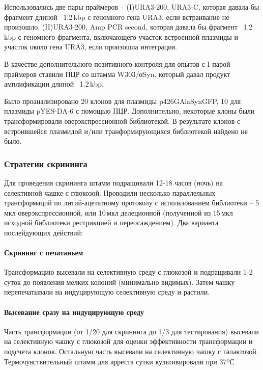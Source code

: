 Использовались две пары праймеров -- (I)URA3-200, URA3-C, которая давала бы фрагмент длиной ~1.2\,kbp с геномного гена URA3, если встраивание не произошло, (II)URA3-200, Amp PCR second, которая давала бы фрагмент ~1.2\,kbp с геномного фрагмента, включающего участок встроенной плазмиды и участок около гена URA3, если произошла интеграция.

В качестве дополнительного позитивного контроля для опытов с I парой праймеров ставили ПЦР со штамма W303/αSyn, который давал продукт амплификации длиной  ~1.2\,kbp. 

Было проанализировано 20 клонов для плазмиды p426GAlaSynGFP, 10 для плазмиды pYES-DA-6 с помощью ПЦР. Дополнительно, некоторые клоны были трансформировали оверэкспрессионной библиотекой. В результате клонов с встроившейся плазмидой и/или транформирующихся библиотекой найдено не было.



\subsubsection{Стратегии скрининга}
\label{subsec:screening_strats}

Для проведения скрининга штамм подращивали 12-18 часов (ночь) на селективной чашке с глюкозой. Проводили несколько параллельных трансформаций по литий-ацетатному протоколу с использованием библиотеки -- 5\,мкл оверэкспрессионной, или 10\,мкл делеционной (полученной из 15\,мкл исходной библиотеки рестрикцией и переосаждением). Два варианта послейдующих действий:

\paragraph{Скрининг с печатаньем}
\label{subsec:printing}
Трансформацию высевали на  селективную среду с глюкозой и подращивали 1-2 суток до появления мелких колоний (минимально видимых). Затем чашку перепечатывали на индуцирующую селективную среду и растили. 
  

\paragraph{Высевание сразу на индуцирующую среду}
\label{subsec:immidiately}
Часть трансформации (от 1/20 для скрининга до 1/3 для тестирования) высевали на  селективную чашку с глюкозой для оценки эффективности трансформации и подсчета клонов. Остальную часть высевали на селективную чашку с галактозой. Термочувствительный штамм для арреста сутки культивировали при 37ºС

